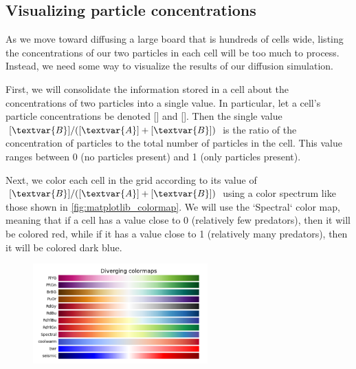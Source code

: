\begin{qbox}[%
Update the cells in \autoref{fig:two_particle_concentration_diffusion} after another generation of diffusion. Use the diffusion rates $d_A = 0.2$ and $d_B = 0.1$.
]\end{qbox}

\FloatBarrier
{}
\subsection{Visualizing particle concentrations}

As we move toward diffusing a large board that is hundreds of cells wide, listing the concentrations of our two particles in each cell will be too much to process. Instead, we need some way to visualize the results of our diffusion simulation.

First, we will consolidate the information stored in a cell about the concentrations of two particles into a single value. In particular, let a cell's particle concentrations be denoted [] and []. Then the single value $[\textvar{B}]/([\textvar{A}] + [\textvar{B}])$ is the ratio of the concentration of  particles to the total number of particles in the cell. This value ranges between 0 (no  particles present) and 1 (only  particles present).

Next, we color each cell in the grid according to its value of $[\textvar{B}]/([\textvar{A}] + [\textvar{B}])$ using a color spectrum like those shown in \autoref{fig:matplotlib_colormap}. We will use the `Spectral` color map, meaning that if a cell has a value close to 0 (relatively few predators), then it will be colored red, while if it has a value close to 1 (relatively many predators), then it will be colored dark blue.\\

\begin{figure}[h]
\centering
\mySfFamily
\includegraphics[width = 0.6\textwidth]{../images/matplotlib_colormap.png}
\caption{}
\label{fig:matplotlib_colormap}
\end{figure}

